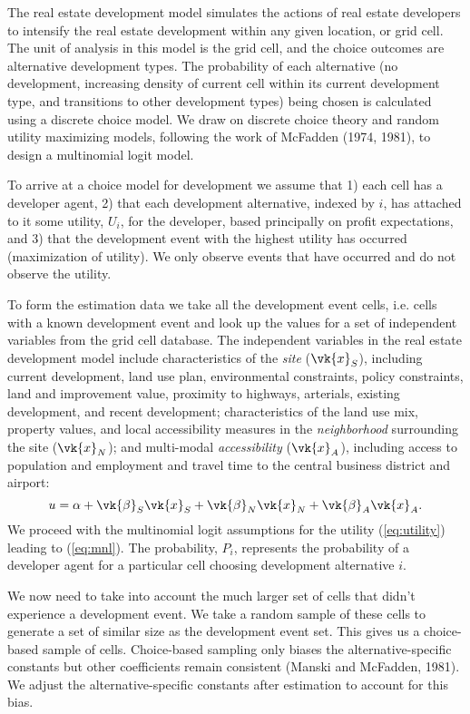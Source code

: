 The real estate development model simulates the actions of real
estate developers to intensify the real estate development within
any given location, or grid cell.  The unit of analysis in this
model is the grid cell, and the choice outcomes are alternative
development types.  The probability of each alternative (no
development, increasing density of current cell within its current
development type, and transitions to other development types)
being chosen is calculated using a discrete choice model. We draw
on discrete choice theory and random utility maximizing models,
following the work of McFadden (1974, 1981), to design a
multinomial logit model.

To arrive at a choice model for development we assume that 1) each
cell has a developer agent, 2) that each development alternative,
indexed by $i$, has attached to it some utility, $U_i$, for the
developer, based principally on profit expectations, and 3) that
the development event with the highest utility has occurred
(maximization of utility). We only observe events that have
occurred and do not observe the utility.

To form the estimation data we take all the development event
cells, i.e. cells with a known development event and look up the
values for a set of independent variables from the grid cell
database. The independent variables in the real estate development
model include characteristics of the \emph{site} ($\vk{x}_S$),
including current development, land use plan, environmental
constraints, policy constraints, land and improvement value,
proximity to highways, arterials, existing development, and recent
development; characteristics of the land use mix, property values,
and local accessibility measures in the \emph{neighborhood}
surrounding the site ($\vk{x}_N$); and multi-modal
\emph{accessibility} ($\vk{x}_A$), including access to population
and employment and travel time to the central business district
and airport:
%
\begin{equation}
    u = \alpha
     + \vk{\beta}_S \vk{x}_S
     + \vk{\beta}_N \vk{x}_N
     + \vk{\beta}_A \vk{x}_A.
     \label{eq:uemploc}
\end{equation}
%
We proceed with the multinomial logit assumptions for the utility
(\ref{eq:utility}) leading to (\ref{eq:mnl}). The probability,
$P_i$, represents the probability of a developer agent for a
particular cell choosing development alternative $i$.

We now need to take into account the much larger set of cells that
didn't experience a development event. We take a random sample of
these cells to generate a set of similar size as the development
event set. This gives us a choice-based sample of cells.
Choice-based sampling only biases the alternative-specific
constants but other coefficients remain consistent (Manski and
McFadden, 1981). We adjust the alternative-specific constants
after estimation to account for this bias.

